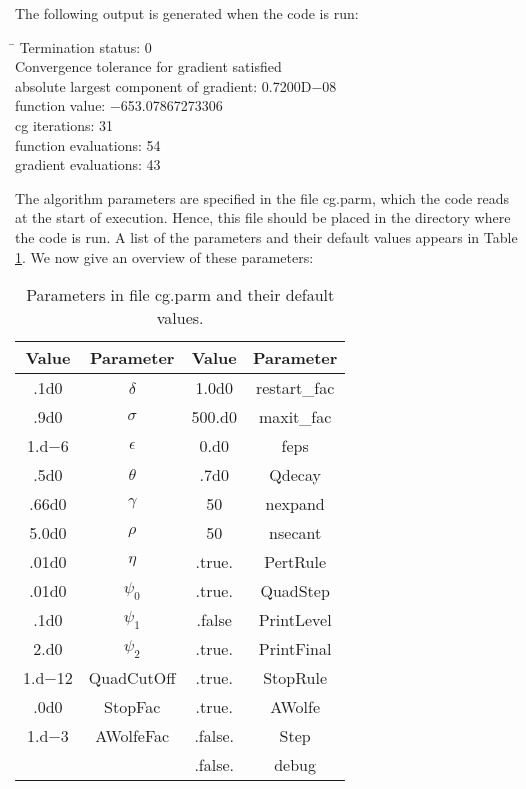 \documentclass [12pt] {article}
\begin{document}
The following output is generated when the code is run:
\begin{tabbing}
\hspace{2em} \= \kill
\> \sc Termination status:  0 \\
\> \sc Convergence tolerance for gradient satisfied \\
\> \sc absolute largest component of gradient: 0.7200D$-$08 \\
\> \sc function value:   $-$653.07867273306 \\
\> \sc cg iterations:  31 \\
\> \sc function evaluations:  54 \\
\> \sc gradient evaluations:  43
\end{tabbing}

The algorithm parameters are specified in
the file {\sc cg.parm}, which the code reads at the start of execution.
Hence, this file should be placed in the directory where the code is run.
A list of the parameters and their default values appears in Table \ref{parm}.
We now give an overview of these parameters:
\begin{table}
\begin{center}
\begin{tabular}{c|c||c|c}
Value & Parameter & Value & Parameter\\
\hline
.1d0      &     $\delta$ & 1.0d0     &     {\sc restart\_fac}\\
.9d0      &     $\sigma$ & 500.d0    &     {\sc maxit\_fac} \\
1.d$-$6     &     $\epsilon$&  0.d0      &     {\sc feps}\\
.5d0      &     $\theta$ & .7d0      &     {\sc Qdecay}\\
.66d0     &     $\gamma$ & 50        &     {\sc nexpand}\\
5.0d0     &     $\rho$ & 50        &     {\sc nsecant}\\
.01d0     &     $\eta$ & .true.        &     {\sc PertRule}\\
.01d0     &     $\psi_0$&  .true.    &     {\sc QuadStep}\\
.1d0      &     $\psi_1$ & .false    &     {\sc PrintLevel}\\
2.d0      &     $\psi_2$&  .true.    &     {\sc PrintFinal}\\
1.d$-$12    &     {\sc QuadCutOff} & .true.   &     {\sc StopRule}\\
.0d0 & {\sc StopFac} & .true.    &     {\sc AWolfe} \\
1.d$-$3 & {\sc AWolfeFac} & .false.   &     {\sc Step} \\
& & .false. & {\sc debug}
\end{tabular}
\end{center}
\caption{Parameters in file {\sc cg.parm} and their default values.}
\label{parm}
\end{table}
\end{document}
